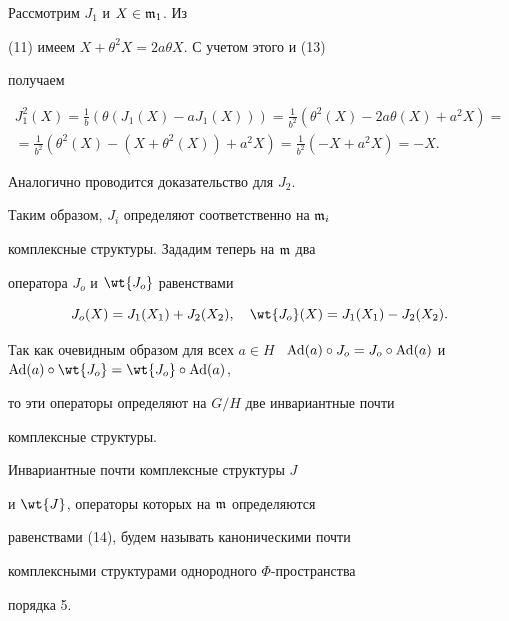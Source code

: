 \begin{pf}


Рассмотрим $J_1$ и $X\in \frak{m}_1$. Из


(11) имеем $X+\theta^2X=2a\theta X$. С учетом этого и (13)


получаем


\begin{multline*}


J^2_1(X)=\frac{1}{b}(\theta (J_1(X)-aJ_1(X)))=


\frac{1}{b^2}(\theta^2(X)-2a\theta(X)+a^2X)= \\


=\frac{1}{b^2}(\theta^2(X)-


(X+\theta^2(X))+a^2X)=\frac{1}{b^2}(-X+a^2X)=-X.


\end{multline*}


Аналогично проводится доказательство для $J_2$.


\end{pf}





Таким образом, $J_i$ определяют соответственно на $\frak{m}_i$


комплексные структуры. Зададим теперь на $\frak{m}$ два


оператора $J_o$ и $\wt{J_o}$ равенствами


\begin{equation}\label{14}


J_o(X)=J_1(X_1)+J_2(X_2),\quad \wt{J_o}(X)=J_1(X_1)-J_2(X_2).


\end{equation}


Так как очевидным образом для всех $a\in H$ \ $\Ad(a)\circ J_o=J_o


\circ \Ad(a)$ и $\Ad(a)\circ \wt{J_o}=\wt{J_o} \circ \Ad(a)$,


то эти операторы определяют на $G/H$ две инвариантные почти


комплексные структуры.





\begin{defn}


Инвариантные почти комплексные структуры $J$


и $\wt{J}$, операторы которых на $\frak{m}$ определяются


равенствами (14), будем называть каноническими почти


комплексными структурами однородного $\Phi$-пространства


порядка 5.


\end{defn}





